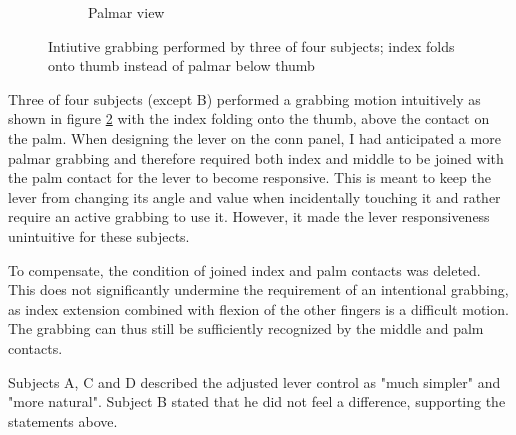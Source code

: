 \documentclass[hyperref, bachelorofscience]{cgvpub}
\begin{document}
\begin{figure}
\begin{subfigure}{.45\linewidth}
		\caption{Palmar view}
		\label{fig:grab:palmar}
	\end{subfigure}
	\caption{Intiutive grabbing performed by three of four subjects; index folds onto thumb instead of palmar below thumb}
	\label{fig:grab}
\end{figure}

Three of four subjects (except B) performed a grabbing motion intuitively as shown in figure \ref{fig:grab} with the index folding onto the thumb, above the contact on the palm. When designing the lever on the conn panel, I had anticipated a more palmar grabbing and therefore required both index and middle to be joined with the palm contact for the lever to become responsive. This is meant to keep the lever from changing its angle and value when incidentally touching it and rather require an active grabbing to use it. However, it made the lever responsiveness unintuitive for these subjects.

To compensate, the condition of joined index and palm contacts was deleted. This does not significantly undermine the requirement of an intentional grabbing, as index extension combined with flexion of the other fingers is a difficult motion. The grabbing can thus still be sufficiently recognized by the middle and palm contacts. 

Subjects A, C and D described the adjusted lever control as "much simpler" and "more natural". Subject B stated that he did not feel a difference, supporting the statements above.
\end{document}
